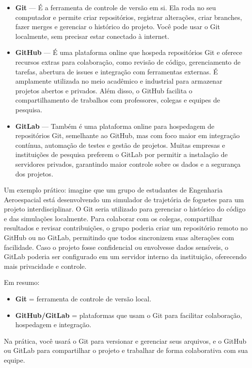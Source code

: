 \begin{itemize}
    \item \textbf{Git} — É a ferramenta de controle de versão em si. Ela roda no seu computador e permite criar repositórios, registrar alterações, criar branches, fazer merges e gerenciar o histórico do projeto. Você pode usar o Git localmente, sem precisar estar conectado à internet.

    \item \textbf{GitHub} — É uma plataforma online que hospeda repositórios Git e oferece recursos extras para colaboração, como revisão de código, gerenciamento de tarefas, abertura de issues e integração com ferramentas externas. É amplamente utilizada no meio acadêmico e industrial para armazenar projetos abertos e privados. Além disso, o GitHub facilita o compartilhamento de trabalhos com professores, colegas e equipes de pesquisa.

    \item \textbf{GitLab} — Também é uma plataforma online para hospedagem de repositórios Git, semelhante ao GitHub, mas com foco maior em integração contínua, automação de testes e gestão de projetos. Muitas empresas e instituições de pesquisa preferem o GitLab por permitir a instalação de servidores privados, garantindo maior controle sobre os dados e a segurança dos projetos.
\end{itemize}

Um exemplo prático: imagine que um grupo de estudantes de Engenharia Aeroespacial está desenvolvendo um simulador de trajetória de foguetes para um projeto interdisciplinar. O Git seria utilizado para gerenciar o histórico do código e das simulações localmente. Para colaborar com os colegas, compartilhar resultados e revisar contribuições, o grupo poderia criar um repositório remoto no GitHub ou no GitLab, permitindo que todos sincronizem suas alterações com facilidade. Caso o projeto fosse confidencial ou envolvesse dados sensíveis, o GitLab poderia ser configurado em um servidor interno da instituição, oferecendo mais privacidade e controle.

Em resumo:
\begin{itemize}
    \item \textbf{Git} = ferramenta de controle de versão local.
    \item \textbf{GitHub/GitLab} = plataformas que usam o Git para facilitar colaboração, hospedagem e integração.
\end{itemize}

Na prática, você usará o Git para versionar e gerenciar seus arquivos, e o GitHub ou GitLab para compartilhar o projeto e trabalhar de forma colaborativa com sua equipe.

